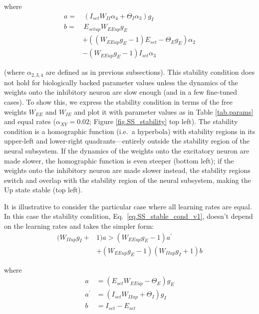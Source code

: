 \documentclass[twocolumn]{article}
\newcommand{\EE}{\mathit{EE}}
\newcommand{\IE}{\mathit{IE}}
\newcommand{\II}{\mathit{II}}
\newcommand{\XY}{\mathit{XY}}
\newcommand{\set}{\mathit{set}}
\newcommand{\up}{\mathit{up}}
\begin{document}
\noindent where
\begin{displaymath}
\begin{aligned}
a = & \, (I_{\set} W_{\II} \alpha_4 + \Theta_I \alpha_3)g_I \\
b = & \, E_{\set\up} W_{\EE\up}g_E \\
& + ((W_{\EE\up} g_E - 1) E_{\set} - \Theta_E g_E)\alpha_2 \\
& - (W_{\EE\up} g_E - 1) I_{\set} \alpha_3
\end{aligned}
\end{displaymath}

\noindent (where $\alpha_{2,3,4}$ are defined as in previous subsections). This stability condition does not hold for biologically backed parameter values unless the dynamics of the weights onto the inhibitory neuron are slow enough (and in a few fine-tuned cases). To show this, we express the stability condition in terms of the free weights $W_{\EE}$ and $W_{\IE}$ and plot it with parameter values as in Table \ref{tab.params} and equal rates ($\alpha_{\XY}=0.02$; Figure \ref{fig.SS_stability} top left). The stability condition is a homographic function (i.e.\ a hyperbola) with stability regions in its upper-left and lower-right quadrants---entirely outside the stability region of the neural subsystem. If the dynamics of the weights onto the excitatory neuron are made slower, the homographic function is even steeper (bottom left); if the weights onto the inhibitory neuron are made slower instead, the stability regions switch and overlap with the stability region of the neural subsystem, making the Up state stable (top left).

It is illustrative to consider the particular case where all learning rates are equal. In this case the stability condition, Eq.\ \ref{eq.SS_stable_cond_v1}, doesn't depend on the learning rates and takes the simpler form:
\begin{equation}
\begin{aligned}
(W_{\II\up} g_I + & 1)a > (W_{\EE\up} g_E - 1)a^\prime \\
& + (W_{\EE\up} g_E - 1)(W_{\II\up} g_I + 1)b
\end{aligned}
\label{eq.SS_stable_cond_v2}
\end{equation}

\noindent where
\begin{displaymath}
\begin{aligned}
a & = (E_{\set} W_{\EE\up} - \Theta_E)g_E \\
a^\prime & = (I_{\set} W_{\II\up} + \Theta_I)g_I \\
b & = I_{\set} - E_{\set}
\end{aligned}
\end{displaymath}
\end{document}
